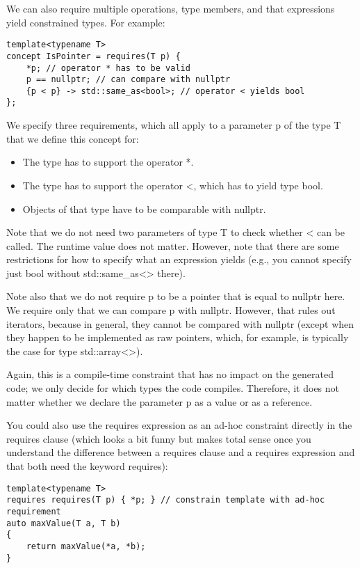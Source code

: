We can also require multiple operations, type members, and that expressions yield constrained types. For example:

\begin{lstlisting}[style=styleCXX]
template<typename T>
concept IsPointer = requires(T p) {
	*p; // operator * has to be valid
	p == nullptr; // can compare with nullptr
	{p < p} -> std::same_as<bool>; // operator < yields bool
};
\end{lstlisting}

We specify three requirements, which all apply to a parameter p of the type T that we define this concept for:

\begin{itemize}
\item
The type has to support the operator *.

\item
The type has to support the operator <, which has to yield type bool.

\item
Objects of that type have to be comparable with nullptr.
\end{itemize}

Note that we do not need two parameters of type T to check whether < can be called. The runtime value does not matter. However, note that there are some restrictions for how to specify what an expression yields (e.g., you cannot specify just bool without std::same\_as<> there).

Note also that we do not require p to be a pointer that is equal to nullptr here. We require only that we can compare p with nullptr. However, that rules out iterators, because in general, they cannot be compared with nullptr (except when they happen to be implemented as raw pointers, which, for example, is typically the case for type std::array<>).

Again, this is a compile-time constraint that has no impact on the generated code; we only decide for which types the code compiles. Therefore, it does not matter whether we declare the parameter p as a value or as a reference.

You could also use the requires expression as an ad-hoc constraint directly in the requires clause (which looks a bit funny but makes total sense once you understand the difference between a requires clause and a requires expression and that both need the keyword requires):

\begin{lstlisting}[style=styleCXX]
template<typename T>
requires requires(T p) { *p; } // constrain template with ad-hoc requirement
auto maxValue(T a, T b)
{
	return maxValue(*a, *b);
}
\end{lstlisting}

